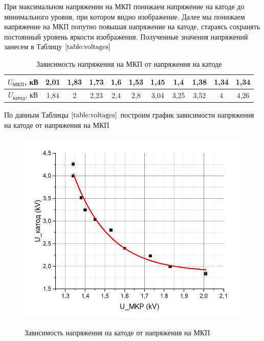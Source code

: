 \documentclass[a4paper,12pt]{article}
\begin{document}
\newpage


При максимальном напряжении на МКП понижаем напряжение на катоде до минимального уровня, при котором видно изображение. Далее мы понижаем напряжение на  МКП попутно повышая напряжение на катоде, стараясь сохранять постоянный уровень яркости изображения. Полученные значения напряжений занесем в Таблицу $\ref{table:voltages}$

\begin{table}[h]
\begin{center}
\caption{Зависимость напряжения на МКП от напряжения на катоде}
\label{table:voltages}
\begin{tabular}{|c|c|c|c|c|c|c|c|c|c|c|}
\hline
\textbf{$U_{МКП}$}, кВ   & {2,01} & {1,83} & {1,73} & {1,6} & 1,53 & 1,45 & 1,4  & 1,38 & 1,34 & 1,34 \\ \hline
\textbf{$U_{катод}$}, кВ & 1,84          & 2             & 2,23          & 2,4          & 2,8  & 3,04 & 3,25 & 3,52 & 4    & 4,26 \\ \hline
\end{tabular}
\end{center}
\end{table}

По данным Таблицы $\ref{table:voltages}$ построим график зависимости напряжения на катоде от напряжения на МКП

\begin{figure}[h!]
	\begin{center}
	\includegraphics[scale=0.8]{last}
	\label{graph:voltages}
	\caption{Зависимость напряжения на катоде от напряжения на МКП}
	\end{center}
\end{figure}
\end{document}
